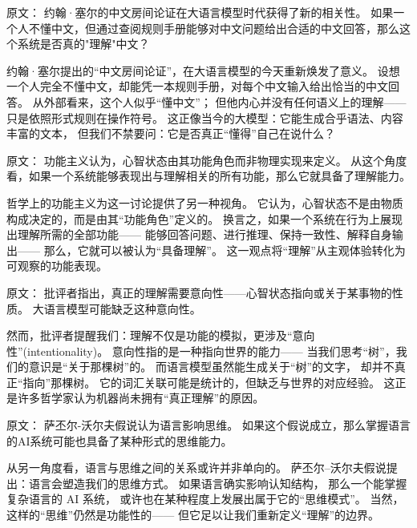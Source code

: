 原文：
约翰·塞尔的中文房间论证在大语言模型时代获得了新的相关性。  
如果一个人不懂中文，但通过查阅规则手册能够对中文问题给出合适的中文回答，那么这个系统是否真的"理解"中文？  

约翰·塞尔提出的“中文房间论证”，在大语言模型的今天重新焕发了意义。  
设想一个人完全不懂中文，却能凭一本规则手册，对每个中文输入给出恰当的中文回答。  
从外部看来，这个人似乎“懂中文”；  
但他内心并没有任何语义上的理解——只是依照形式规则在操作符号。  
这正像当今的大模型：它能生成合乎语法、内容丰富的文本，  
但我们不禁要问：它是否真正“懂得”自己在说什么？  



原文：
功能主义认为，心智状态由其功能角色而非物理实现来定义。  
从这个角度看，如果一个系统能够表现出与理解相关的所有功能，那么它就具备了理解能力。  

哲学上的功能主义为这一讨论提供了另一种视角。  
它认为，心智状态不是由物质构成决定的，而是由其“功能角色”定义的。  
换言之，如果一个系统在行为上展现出理解所需的全部功能——  
能够回答问题、进行推理、保持一致性、解释自身输出——  
那么，它就可以被认为“具备理解”。  
这一观点将“理解”从主观体验转化为可观察的功能表现。  



原文：
批评者指出，真正的理解需要意向性——心智状态指向或关于某事物的性质。  
大语言模型可能缺乏这种意向性。  

然而，批评者提醒我们：理解不仅是功能的模拟，更涉及“意向性”(intentionality)。  
意向性指的是一种指向世界的能力——  
当我们思考“树”，我们的意识是“关于那棵树”的。  
而语言模型虽然能生成关于“树”的文字，  
却并不真正“指向”那棵树。  
它的词汇关联可能是统计的，但缺乏与世界的对应经验。  
这正是许多哲学家认为机器尚未拥有“真正理解”的原因。  



原文：
萨丕尔-沃尔夫假说认为语言影响思维。  
如果这个假说成立，那么掌握语言的AI系统可能也具备了某种形式的思维能力。  

从另一角度看，语言与思维之间的关系或许并非单向的。  
萨丕尔–沃尔夫假说提出：语言会塑造我们的思维方式。  
如果语言确实影响认知结构，  
那么一个能掌握复杂语言的 AI 系统，  
或许也在某种程度上发展出属于它的“思维模式”。  
当然，这样的“思维”仍然是功能性的——  
但它足以让我们重新定义“理解”的边界。  



